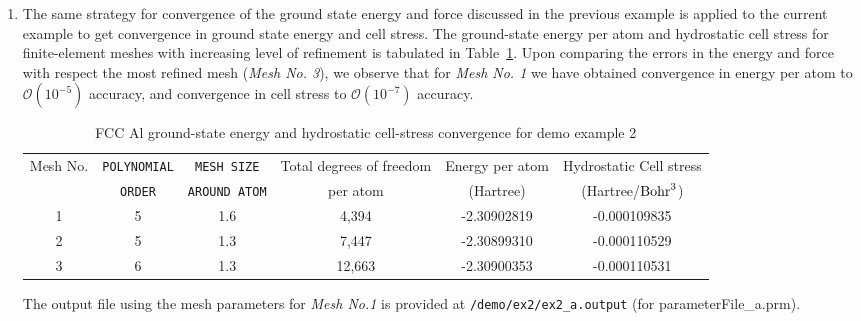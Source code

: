 \begin{enumerate}
\item The same strategy for convergence of the ground state energy and force discussed
in the previous example is applied to the current example to get convergence in ground state energy and cell stress. 
The ground-state energy per atom and hydrostatic cell stress for finite-element meshes with increasing level of refinement is tabulated in Table~\ref{tab:table2}. Upon comparing the errors in the energy and force with respect the most refined mesh (\emph{Mesh No. 3}), we observe that for \emph{Mesh No. 1} we have obtained convergence in energy per atom to $\mathcal{O}(10^{-5})$ accuracy, and convergence in cell stress to $\mathcal{O}(10^{-7})$ accuracy.
\begin{table}[h!]
  \begin{center}
\small	  
    \caption{FCC Al ground-state energy and hydrostatic cell-stress convergence for demo example 2}
    \label{tab:table2}
    \begin{tabular}{c|c|c|c|c|c} 
	    \hline\hline
	    Mesh No. &\verb|POLYNOMIAL| &\verb|MESH SIZE| & Total degrees of freedom& Energy per atom & Hydrostatic Cell stress\\
	    &\verb|ORDER| &\verb|AROUND ATOM| & per atom  & (Hartree) & (Hartree/${\rm Bohr}^3$) \\
      \hline
	    1& 5 & 1.6 & 4,394 & -2.30902819 &  -0.000109835\\	    
	    2& 5 & 1.3 & 7,447 & -2.30899310 &  -0.000110529\\
	    3& 6 & 1.3 & 12,663& -2.30900353 &  -0.000110531\\
       \hline\hline
    \end{tabular}
  \end{center}
\end{table}
The output file using the mesh parameters for \emph{Mesh No.1} is provided at \verb|/demo/ex2/ex2_a.output| (for parameterFile\_a.prm).


\end{enumerate}
